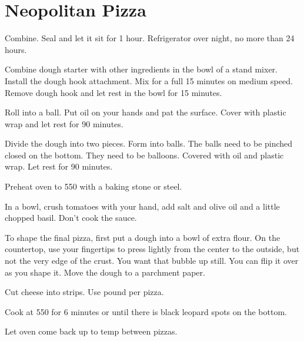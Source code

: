 \section{Neopolitan Pizza}
\begin{recipe}



Combine. Seal and let it sit for 1 hour. Refrigerator over night, no more than 24 hours. 


Combine dough starter with other ingredients in the bowl of a stand mixer. Install the dough hook attachment. Mix for a full 15 minutes on medium speed. Remove dough hook and let rest in the bowl for 15 minutes. 

Roll into a ball. Put oil on your hands and pat the surface. Cover with plastic wrap and let rest for 90 minutes. 

Divide the dough into two pieces. Form into balls. The balls need to be pinched closed on the bottom. They need to be balloons. Covered with oil and plastic wrap. Let rest for 90 minutes. 

Preheat oven to 550\degree{} with a baking stone or steel. 


In a bowl, crush tomatoes with your hand, add salt and olive oil and a little chopped basil. Don't cook the sauce.

To shape the final pizza, first put a dough into a bowl of extra flour. On the countertop, use your fingertips to press lightly from the center to the outside, but not the very edge of the crust. You want that bubble up still. You can flip it over as you shape it. Move the dough to a parchment paper. 


Cut cheese into strips. Use  pound per pizza. 

Cook at 550\degree{} for 6 minutes or until there is black leopard spots on the bottom.  

Let oven come back up to temp between pizzas.

\end{recipe}
